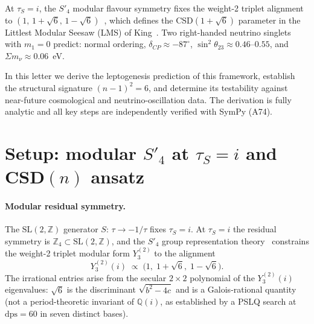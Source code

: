 \documentclass[aps,prl,twocolumn,showpacs,superscriptaddress]{revtex4-2}
\newcommand{\Qi}{\mathbb{Q}(i)}
\begin{document}
At $\tau_S = i$, the $S'_4$ modular flavour symmetry fixes the
weight-2 triplet alignment to
$(1,\,1+\sqrt{6},\,1-\sqrt{6})$~\cite{DKLL19,LMS22},
which defines the CSD$(1+\sqrt{6})$ parameter in the Littlest
Modular Seesaw (LMS) of King~\cite{LS16,LMS22}.  Two right-handed
neutrino singlets with $m_1 = 0$ predict:
normal ordering, $\delta_{CP} \approx -87^{\circ}$,
$\sin^2\theta_{23} \approx 0.46$--$0.55$,
and $\Sigma m_\nu \approx 0.06$~eV.

In this letter we derive the leptogenesis prediction of this
framework, establish the structural signature $(n-1)^2=6$, and
determine its testability against near-future cosmological and
neutrino-oscillation data.  The derivation is fully analytic and
all key steps are independently verified with SymPy (A74).

\section{Setup: modular $S'_4$ at $\tau_S=i$ and CSD$(n)$ ansatz}
\label{sec:setup}

\paragraph{Modular residual symmetry.}
The $\mathrm{SL}(2,\mathbb{Z})$ generator $S$: $\tau \to -1/\tau$
fixes $\tau_S = i$.  At $\tau_S = i$ the residual symmetry is
$\mathbb{Z}_4 \subset \mathrm{SL}(2,\mathbb{Z})$, and the $S'_4$
group representation theory~\cite{NPP20} constrains the weight-2
triplet modular form $Y_3^{(2)}$ to the alignment
\begin{equation}
  Y_3^{(2)}(i) \;\propto\; \bigl(1,\;1+\sqrt{6},\;1-\sqrt{6}\bigr).
  \label{eq:align}
\end{equation}
The irrational entries arise from the secular $2\times 2$ polynomial
of the $Y_3^{(2)}(i)$ eigenvalues: $\sqrt{6}$ is the discriminant
$\sqrt{b^2-4c}$ and is a Galois-rational quantity (not a
period-theoretic invariant of $\Qi$, as established by a PSLQ
search at $\mathrm{dps}=60$ in seven distinct bases).
\end{document}
